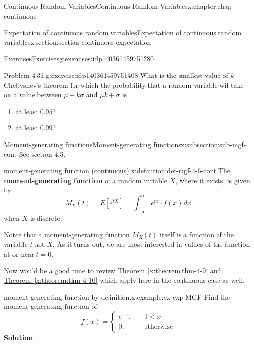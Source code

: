 \documentclass[oneside,10pt,]{book}
\newcommand{\blocktitlefont}{\relax}
\newcommand{\xreffont}{\relax}
\newcommand{\terminology}[1]{\textbf{#1}}
\numberwithin{equation}{section}
\newcommand{\lt}{<}
\newcommand{\amp}{&}
\begin{document}
\begin{chapterptx}{Continuous Random Variables}{}{Continuous Random Variables}{}{}{x:chapter:chap-continuous}
\begin{sectionptx}{Expectation of continuous random variables}{}{Expectation of continuous random variables}{}{}{x:section:section-continuous-expectation}
\begin{exercises-subsection}{Exercises}{}{Exercises}{}{}{g:exercises:idp140361459751280}
\begin{divisionexercise}{1}{Problem 4.31.}{}{g:exercise:idp140361459751408}%
What is the smallest value of \(k\) Chebyshev's theorem for which the probability that a random variable wil take on a value between \(\mu -k\sigma\) and \(\mu k+\sigma\) is%
\begin{enumerate}[label=(\alph*)]
\item{}at least \(0.95\)?%
\item{}at least \(0.99\)?%
\end{enumerate}
%
\end{divisionexercise}%
\end{exercises-subsection}
%
%
\typeout{************************************************}
\typeout{************************************************}
%
\begin{subsectionptx}{Moment-generating functions}{}{Moment-generating functions}{}{}{x:subsection:sub-mgf-cont}
See section 4.5.%
\begin{definition}{moment-generating function (continuous).}{x:definition:def-mgf-4-6-cont}%
The \terminology{moment-generating function} of a random variable \(X\), where it exists, is given by%
\begin{equation*}
\displaystyle
M_X(t) = E[e^{tX}] = \int_{-\infty}^\infty e^{tx}\cdot f(x)\,dx
\end{equation*}
when \(X\) is discrete.%
\end{definition}
Notce that a moment-generating function \(\displaystyle M_X(t)\) itself is a function of the variable \(\displaystyle t\) not \(X\). As it turns out, we are most interested in values of the function at or near \(t=0\).%
\par
Now would be a good time to review \hyperref[x:theorem:thm-4-9]{Theorem~{\xreffont\ref{x:theorem:thm-4-9}}} and \hyperref[x:theorem:thm-4-10]{Theorem~{\xreffont\ref{x:theorem:thm-4-10}}} which apply here in the continuous case as well.%
\begin{example}{moment-generating function by definition.}{x:example:ex-exp-MGF}%
Find the moment-generating function of%
\begin{equation*}
f(x) = \begin{cases}e^{-x},
\amp \quad 0 \lt x
\\ 0, \amp \quad
\text{otherwise}\end{cases}
\end{equation*}
%
\textbf{\blocktitlefont Solution}.\quad{}%
\begin{equation*}

\end{equation*}
\end{example}
\end{subsectionptx}
\end{sectionptx}
\end{chapterptx}
\end{document}
